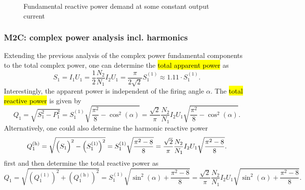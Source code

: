 \begin{frame}[c]
\begin{figure}
        \caption{Fundamental reactive power demand at some constant output current}
        \label{fig:M2C_reactive_power_demand}
    \end{figure}
\end{frame}

\begin{frame}[c]
    \frametitle{M2C: complex power analysis incl. harmonics}
    Extending the previous analysis of the complex power fundamental components to the total complex power, one can determine the \hl{total apparent power} as
    \begin{equation}
        S_1 = I_1 U_1 = \frac{1}{2}\frac{N_2}{N_1} I_2 U_1 = \frac{\pi}{2\sqrt{2}}S_1^{(1)}\approx 1.11 \cdot S_1^{(1)}. 
    \end{equation}
    Interestingly, the apparent power is independent of the firing angle $\alpha$. The \hl{total reactive power} is given by
    \begin{equation}
        Q_1 = \sqrt{S_1^2 - P_1^2} = S_1^{(1)}\sqrt{\frac{\pi^2}{8} - \cos^2(\alpha)}=\frac{\sqrt{2}}{\pi} \frac{N_2}{N_1} I_2U_1\sqrt{\frac{\pi^2}{8} - \cos^2(\alpha)}.
    \end{equation}
    Alternatively, one could also determine the harmonic reactive power
    \begin{equation}
        Q_{1}^{(\mathrm{h})} = \sqrt{\left(S_1\vphantom{S_1^{(1)}}\right)^2 - \left(S_1^{(1)}\right)^2} = S_1^{(1)}\sqrt{\frac{\pi^2-8}{8}}=\frac{\sqrt{2}}{\pi} \frac{N_2}{N_1} I_2U_1\sqrt{\frac{\pi^2-8}{8}}.
    \end{equation}
    first and then determine the total reactive power as
    \begin{equation*}
        Q_1 = \sqrt{\left(Q_1^{(1)}\right)^2 + \left(Q_{1}^{(\mathrm{h})}\right)^2 } = S_1^{(1)}\sqrt{\sin^2(\alpha)+\frac{\pi^2-8}{8}}=\frac{\sqrt{2}}{\pi} \frac{N_2}{N_1} I_2U_1\sqrt{\sin^2(\alpha)+\frac{\pi^2-8}{8}}.
    \end{equation*}
\end{frame}

